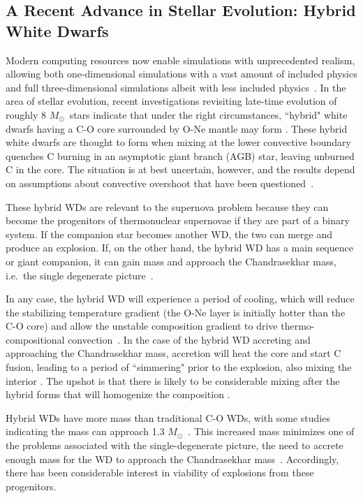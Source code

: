 \documentclass[preprint2]{aastex63}
\newcommand{\Msun}{\ensuremath{M_\odot}}
\begin{document}
\subsection{A Recent Advance in Stellar Evolution: Hybrid White Dwarfs}

Modern computing resources now enable simulations with unprecedented
realism, allowing both one-dimensional simulations with a vast
amount of included physics and full three-dimensional simulations
albeit with less included physics~\citep[][and references therein]{caldertownsley2018}.
In the area of stellar evolution, recent investigations revisiting
late-time evolution of roughly 8 \Msun~stars indicate that under
the right circumstances, ``hybrid" white dwarfs having a C-O core surrounded by O-Ne
mantle may form \citep{siess2009,denissenkovetal2013}. These hybrid
white dwarfs are thought to form when mixing at the lower convective boundary quenches
C burning in an asymptotic giant branch (AGB) star, leaving unburned C
in the core. The situation is at best uncertain, however, and the
results depend on assumptions about convective
overshoot that have been questioned~\citep{chenetal2014,lecoanetetal16,lattanzioetal2017}.

These hybrid WDs are relevant to the supernova problem because 
they can become the progenitors of thermonuclear supernovae
if they are part of a binary system. If the companion star becomes
another WD, the two can merge and produce an explosion.
If, on the other hand, the hybrid WD has a main sequence 
or giant companion, it can gain mass and approach the Chandrasekhar mass, i.e.\  
the single degenerate picture~\citep{willcoxetal2016}.

In any case, the hybrid WD will experience a period of cooling,
which will reduce the stabilizing temperature gradient (the O-Ne layer is initially hotter 
than the C-O core) and allow the unstable composition gradient to drive 
thermo-compositional convection~\citep{brooksetal2017,schwabgaraud2019}.
In the case of the
hybrid WD accreting and approaching the Chandrasekhar mass, accretion will
heat the core and start C fusion, leading to a period of ``simmering" prior
to the explosion, also mixing the interior \citep{PiroBild08}. The upshot is 
that there is likely to be considerable mixing after the hybrid forms that will 
homogenize the composition \citep{denissenkovetal2015,brooksetal2017,schwabgaraud2019}.

Hybrid WDs have more mass than traditional C-O WDs, with some studies indicating the
mass can approach 1.3 \Msun\ \citep{chenetal2014}. This increased mass
minimizes one of the problems associated with the single-degenerate picture,
the need to accrete enough mass for the WD to approach the Chandrasekhar
mass~\citep{chenetal2014,denissenkovetal2015,kromeretal2015}.
Accordingly, there has been considerable interest in viability of explosions from
these progenitors.
\end{document}
